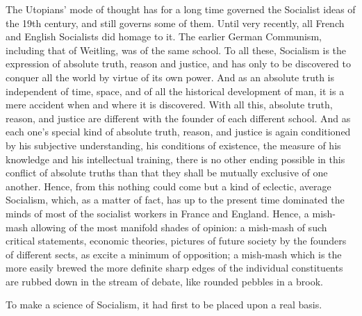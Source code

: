 The Utopians' mode of thought has for a long time governed the Socialist ideas
of the 19th century, and still governs some of them. Until very recently, all
French and English Socialists did homage to it. The earlier German Communism,
including that of Weitling, was of the same school. To all these, Socialism is
the expression of absolute truth, reason and justice, and has only to be
discovered to conquer all the world by virtue of its own power. And as an
absolute truth is independent of time, space, and of all the historical
development of man, it is a mere accident when and where it is discovered. With
all this, absolute truth, reason, and justice are different with the founder of
each different school. And as each one's special kind of absolute truth, reason,
and justice is again conditioned by his subjective understanding, his conditions
of existence, the measure of his knowledge and his intellectual training, there
is no other ending possible in this conflict of absolute truths than that they
shall be mutually exclusive of one another. Hence, from this nothing could come
but a kind of eclectic, average Socialism, which, as a matter of fact, has up to
the present time dominated the minds of most of the socialist workers in France
and England. Hence, a mish-mash allowing of the most manifold shades of opinion:
a mish-mash of such critical statements, economic theories, pictures of future
society by the founders of different sects, as excite a minimum of opposition;
a mish-mash which is the more easily brewed the more definite sharp edges of the
individual constituents are rubbed down in the stream of debate, like rounded
pebbles in a brook.

To make a science of Socialism, it had first to be placed upon a real basis.

\printendnotes